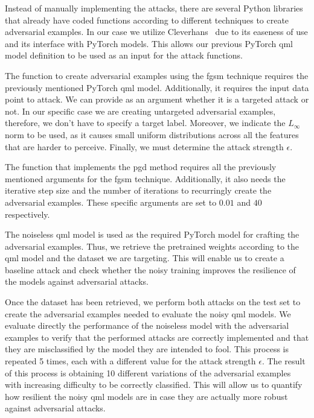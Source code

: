 Instead of manually implementing the attacks, there are
several Python libraries that already have coded functions according
to different techniques to create adversarial examples. In our
case we utilize Cleverhans~\cite{papernot_technical_2018} due
to its easeness of use and its interface with PyTorch models.
This allows our previous PyTorch \ac{qml} model definition to
be used as an input for the attack functions. \

The function to create adversarial examples using the
\ac{fgsm} technique requires the previously mentioned
PyTorch \ac{qml} model. Additionally, it requires the
input data point to attack. We can provide as an argument
whether it is a targeted attack or not. In our specific
case we are creating untargeted adversarial examples,
therefore, we don't have to specify a target label.
Moreover, we indicate the \(L_{\infty}\) norm to be used,
as it causes small uniform distributions across all
the features that are harder to perceive. Finally,
we must determine the attack strength \(\epsilon\). \

The function that implements the \ac{pgd} method
requires all the previously mentioned arguments
for the \ac{fgsm} technique. Additionally, it
also needs the iterative step size and the
number of iterations to recurringly create the
adversarial examples. These specific arguments are
set to \(0.01\)  and \(40\) respectively. \

The noiseless \ac{qml} model is used as the required
PyTorch model for crafting the adversarial examples.
Thus, we retrieve the pretrained weights according to the
\ac{qml} model and the dataset we are targeting.
This will enable us to create a baseline attack
and check whether the noisy training improves
the resilience of the models against adversarial
attacks. \

Once the dataset has been retrieved, we perform
both attacks on the test set to create the adversarial
examples needed to evaluate the noisy \ac{qml} models.
We evaluate directly the performance of the noiseless
model with the adversarial examples to verify that
the performed attacks are correctly implemented and
that they are misclassified by the model they are
intended to fool. This process is repeated 5 times,
each with a different value for the attack strength
\(\epsilon\). The result of this process is obtaining
10 different variations of the adversarial examples with
increasing difficulty to be correctly classified. This will
allow us to quantify how resilient the noisy \ac{qml}
models are in case they are actually more robust
against adversarial attacks. \


